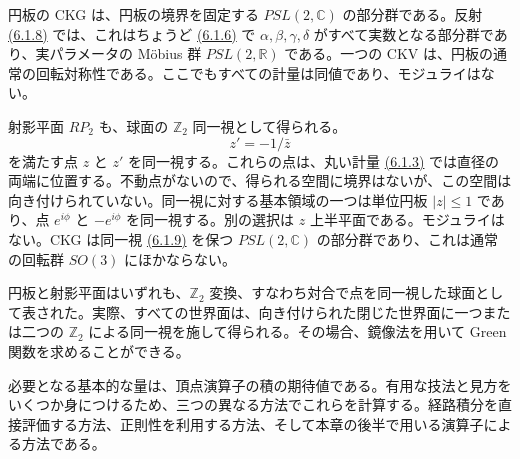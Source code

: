 円板の CKG は、円板の境界を固定する $PSL(2,\mathbb C)$ の部分群である。反射 \hyperref[eq:6.1.8]{(6.1.8)} では、これはちょうど \hyperref[eq:6.1.6]{(6.1.6)} で $\alpha,\beta,\gamma,\delta$ がすべて実数となる部分群であり、実パラメータの Möbius 群 $PSL(2,\mathbb R)$ である。一つの CKV は、円板の通常の回転対称性である。ここでもすべての計量は同値であり、モジュライはない。


射影平面 $RP_2$ も、球面の $\mathbb Z_2$ 同一視として得られる。
\begin{equation}
z'=-1/\bar z
\tag{6.1.9}\label{eq:6.1.9}
\end{equation}
を満たす点 $z$ と $z'$ を同一視する。これらの点は、丸い計量 \hyperref[eq:6.1.3]{(6.1.3)} では直径の両端に位置する。不動点がないので、得られる空間に境界はないが、この空間は向き付けられていない。同一視に対する基本領域の一つは単位円板 $|z|\leq1$ であり、点 $e^{i\phi}$ と $-e^{i\phi}$ を同一視する。別の選択は $z$ 上半平面である。モジュライはない。CKG は同一視 \hyperref[eq:6.1.9]{(6.1.9)} を保つ $PSL(2,\mathbb C)$ の部分群であり、これは通常の回転群 $SO(3)$ にほかならない。

円板と射影平面はいずれも、$\mathbb Z_2$ 変換、すなわち対合で点を同一視した球面として表された。実際、すべての世界面は、向き付けられた閉じた世界面に一つまたは二つの $\mathbb Z_2$ による同一視を施して得られる。その場合、鏡像法を用いて Green 関数を求めることができる。

\label{sec:6.2}

必要となる基本的な量は、頂点演算子の積の期待値である。有用な技法と見方をいくつか身につけるため、三つの異なる方法でこれらを計算する。経路積分を直接評価する方法、正則性を利用する方法、そして本章の後半で用いる演算子による方法である。


